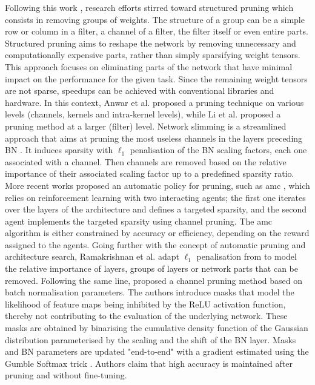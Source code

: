 Following this work \cite{DBLP:conf/nips/HanPTD15}, research efforts stirred
toward structured pruning which consists in removing groups of weights. The
structure of a group can be a simple row or column in a filter, a channel of a
filter, the filter itself or even entire parts. Structured pruning aims to
reshape the network by removing unnecessary and computationally expensive
parts, rather than simply sparsifying weight tensors. This approach focuses
on eliminating parts of the network that have minimal impact on the performance
for the given task. Since the remaining weight tensors are not sparse, speedups
can be achieved with conventional libraries and hardware. In this context, Anwar
et al. \cite{anwar2017structured} proposed a pruning technique on various levels
(channels, kernels and intra-kernel levels), while Li et al.
\cite{DBLP:conf/iclr/0022KDSG17} proposed a pruning method at a larger (filter)
level. Network slimming \cite{DBLP:conf/iccv/LiuLSHYZ17} is a streamlined
approach that aims at pruning the most useless channels in the layers preceding
\ac{BN} \cite{DBLP:conf/icml/IoffeS15}. It induces sparsity with $\ell_1$
penalisation of the \ac{BN} scaling factors, each one associated with a
channel. Then channels are removed based on the relative importance of their
associated scaling factor up to a predefined sparsity ratio. More recent works
proposed an automatic policy for pruning, such as \ac{amc}
\cite{DBLP:conf/eccv/HeLLWLH18}, which relies on reinforcement learning with two
interacting agents; the first one iterates over the layers of the architecture
and defines a targeted sparsity, and the second agent implements the targeted
sparsity using channel pruning. The \ac{amc} algorithm is either constrained by
accuracy or efficiency, depending on the reward assigned to the agents. Going
further with the concept of automatic pruning and architecture search,
Ramakrishnan et al. \cite{DBLP:conf/crv/RamakrishnanSN20} adapt $\ell_1$
penalisation from \cite{DBLP:conf/iccv/LiuLSHYZ17} to model the relative
importance of layers, groups of layers or network parts that can be removed.
Following the same line, \cite{DBLP:conf/icml/KangH20} proposed a channel
pruning method based on batch normalisation parameters. The authors introduce
masks that model the likelihood of feature maps being inhibited by the \ac{ReLU}
activation function, thereby not contributing to the evaluation of the
underlying network. These masks are obtained by binarising the cumulative
density function of the Gaussian distribution parameterised by the scaling and
the shift of the BN layer. Masks and BN parameters are updated "end-to-end" with
a gradient estimated using the Gumble Softmax trick
\cite{DBLP:conf/iclr/JangGP17}. Authors claim that high accuracy is maintained
after pruning and without fine-tuning. \\



